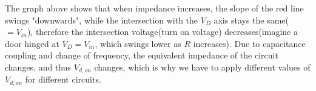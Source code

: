 \documentclass[a4paper, itemph]{oblivoir}
\theoremstyle{definition}
\begin{document}
The graph above shows that when impedance increases, the slope of the red line swings "downwards", while the intersection with the $V_D$ axis stays the same($=V_{in}$), therefore the intersection voltage(turn on voltage) decreases(imagine a door hinged at $V_D=V_{in}$, which swings lower as $R$ increases). Due to capacitance coupling and change of frequency, the equivalent impedance of the circuit changes, and thus $V_{d,on}$ changes, which is why we have to apply different values of $V_{d,on}$ for different circuits.
\end{document}
